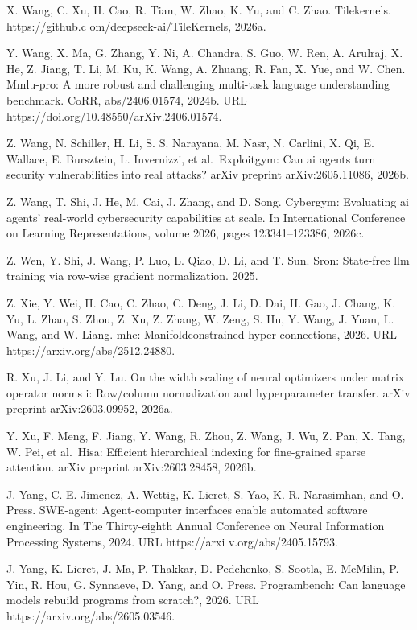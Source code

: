 \documentclass[
  10
]{article}
\begin{document}
X. Wang, C. Xu, H. Cao, R. Tian, W. Zhao, K. Yu, and C. Zhao.
Tilekernels. https://github.c om/deepseek-ai/TileKernels, 2026a.

Y. Wang, X. Ma, G. Zhang, Y. Ni, A. Chandra, S. Guo, W. Ren, A. Arulraj,
X. He, Z. Jiang, T. Li, M. Ku, K. Wang, A. Zhuang, R. Fan, X. Yue, and
W. Chen. Mmlu-pro: A more robust and challenging multi-task language
understanding benchmark. CoRR, abs/2406.01574, 2024b. URL
https://doi.org/10.48550/arXiv.2406.01574.

Z. Wang, N. Schiller, H. Li, S. S. Narayana, M. Nasr, N. Carlini, X. Qi,
E. Wallace, E. Bursztein, L. Invernizzi, et al.~Exploitgym: Can ai
agents turn security vulnerabilities into real attacks? arXiv preprint
arXiv:2605.11086, 2026b.

Z. Wang, T. Shi, J. He, M. Cai, J. Zhang, and D. Song. Cybergym:
Evaluating ai agents' real-world cybersecurity capabilities at scale. In
International Conference on Learning Representations, volume 2026, pages
123341--123386, 2026c.

Z. Wen, Y. Shi, J. Wang, P. Luo, L. Qiao, D. Li, and T. Sun. Sron:
State-free llm training via row-wise gradient normalization. 2025.

Z. Xie, Y. Wei, H. Cao, C. Zhao, C. Deng, J. Li, D. Dai, H. Gao, J.
Chang, K. Yu, L. Zhao, S. Zhou, Z. Xu, Z. Zhang, W. Zeng, S. Hu, Y.
Wang, J. Yuan, L. Wang, and W. Liang. mhc: Manifoldconstrained
hyper-connections, 2026. URL https://arxiv.org/abs/2512.24880.

R. Xu, J. Li, and Y. Lu. On the width scaling of neural optimizers under
matrix operator norms i: Row/column normalization and hyperparameter
transfer. arXiv preprint arXiv:2603.09952, 2026a.

Y. Xu, F. Meng, F. Jiang, Y. Wang, R. Zhou, Z. Wang, J. Wu, Z. Pan, X.
Tang, W. Pei, et al.~Hisa: Efficient hierarchical indexing for
fine-grained sparse attention. arXiv preprint arXiv:2603.28458, 2026b.

J. Yang, C. E. Jimenez, A. Wettig, K. Lieret, S. Yao, K. R. Narasimhan,
and O. Press. SWE-agent: Agent-computer interfaces enable automated
software engineering. In The Thirty-eighth Annual Conference on Neural
Information Processing Systems, 2024. URL https://arxi
v.org/abs/2405.15793.

J. Yang, K. Lieret, J. Ma, P. Thakkar, D. Pedchenko, S. Sootla, E.
McMilin, P. Yin, R. Hou, G. Synnaeve, D. Yang, and O. Press.
Programbench: Can language models rebuild programs from scratch?, 2026.
URL https://arxiv.org/abs/2605.03546.
\end{document}
